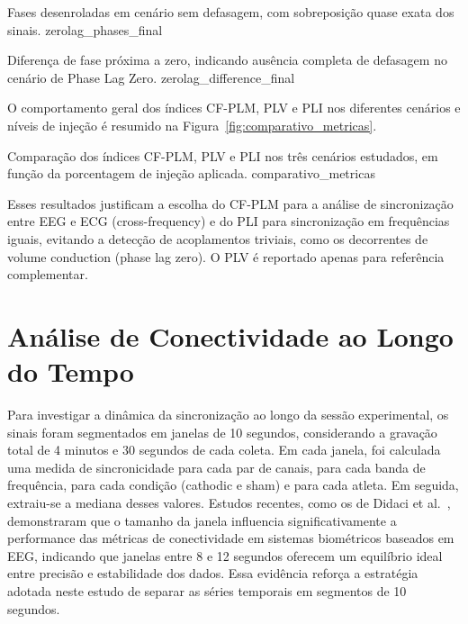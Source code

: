 \begin{itemize}
{Fases desenroladas em cenário sem defasagem, com sobreposição quase exata dos sinais.}
{zerolag_phases_final}

{Diferença de fase próxima a zero, indicando ausência completa de defasagem no cenário de Phase Lag Zero.}
{zerolag_difference_final}


O comportamento geral dos índices CF-PLM, PLV e PLI nos diferentes cenários e níveis de injeção é resumido na Figura~\ref{fig:comparativo_metricas}.

{Comparação dos índices CF-PLM, PLV e PLI nos três cenários estudados, em função da porcentagem de injeção aplicada.}
{comparativo_metricas}

Esses resultados justificam a escolha do CF-PLM para a análise de sincronização entre EEG e ECG (cross-frequency) e do PLI para sincronização em frequências iguais, evitando a detecção de acoplamentos triviais, como os decorrentes de volume conduction (phase lag zero). O PLV é reportado apenas para referência complementar.

\section{Análise de Conectividade ao Longo do Tempo}
\label{sec:connectivity_over_time}

Para investigar a dinâmica da sincronização ao longo da sessão experimental, os sinais foram segmentados em janelas de 10 segundos, considerando a gravação total de 4 minutos e 30 segundos de cada coleta. Em cada janela, foi calculada uma medida de sincronicidade para cada par de canais, para cada banda de frequência, para cada condição (cathodic e sham) e para cada atleta. Em seguida, extraiu-se a mediana desses valores. Estudos recentes, como os de Didaci et al.~\cite{didaci2024how}, demonstraram que o tamanho da janela influencia significativamente a performance das métricas de conectividade em sistemas biométricos baseados em EEG, indicando que janelas entre 8 e 12 segundos oferecem um equilíbrio ideal entre precisão e estabilidade dos dados. Essa evidência reforça a estratégia adotada neste estudo de separar as séries temporais em segmentos de 10 segundos.


\end{itemize}
